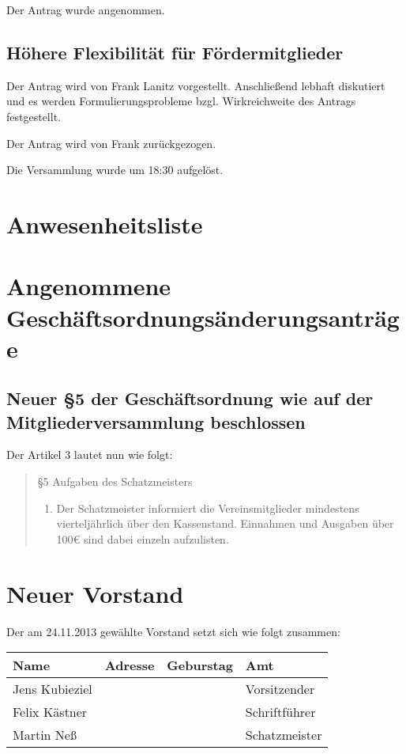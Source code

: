 \documentclass{scrartcl}
\begin{document}
Der Antrag wurde angenommen.

\subsection{Höhere Flexibilität für Fördermitglieder}
Der Antrag wird von Frank Lanitz vorgestellt.
Anschließend lebhaft diskutiert und es werden 
Formulierungsprobleme bzgl. Wirkreichweite des Antrags festgestellt.

Der Antrag wird von Frank zurückgezogen.

Die Versammlung wurde um 18:30 aufgelöst.  %

\newpage 
\appendix{}
\section{Anwesenheitsliste}
\newpage 
\section{Angenommene Geschäftsordnungsänderungsanträge}
\subsection{Neuer §5 der Geschäftsordnung wie auf der Mitgliederversammlung beschlossen}
Der Artikel 3 lautet nun wie folgt: 

\begin{quote}

§5 Aufgaben des Schatzmeisters

\begin{enumerate}
    \item Der Schatzmeister informiert die Vereinsmitglieder
        mindestens vierteljährlich über den
        Kassenstand. Einnahmen und Ausgaben über 100\euro{} sind dabei
        einzeln aufzulisten.
\end{enumerate}
\end{quote}

\newpage 
\section{Neuer Vorstand}

Der am 24.11.2013 gewählte Vorstand setzt sich wie folgt zusammen: 

\label{sec:neuer_vorstand}
\begin{table}[h!]
    \centering
    \begin{tabular}{l|l|c|l}
        \textbf{Name} & \textbf{Adresse} & \textbf{Geburstag} & \textbf{Amt} \\ \hline
        Jens Kubieziel & & & Vorsitzender \\
        Felix Kästner & & & Schriftführer \\
        Martin Neß & & & Schatzmeister 
    \end{tabular}
\end{table}
\end{document}

